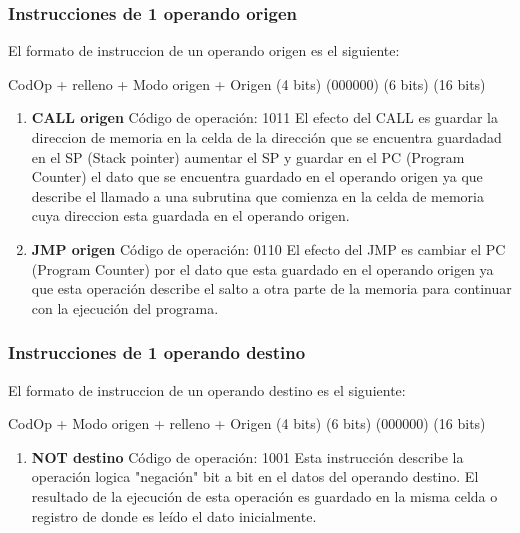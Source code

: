 \subsubsection{Instrucciones de 1 operando origen}

El formato de instruccion de un operando origen es el siguiente:

  CodOp   +   relleno   +  Modo origen +   Origen
(4 bits)      (000000)        (6 bits)    (16 bits)

\begin{enumerate}
\item \textbf{CALL origen}
Código de operación: 1011
El efecto del CALL es guardar la direccion de memoria en la celda de la dirección que se encuentra guardadad en el SP (Stack pointer) aumentar el SP y guardar en el PC (Program Counter) el dato que se encuentra guardado en el operando origen ya que describe el llamado a una subrutina que comienza en la celda de memoria cuya direccion esta guardada en el operando origen.

\item \textbf{JMP origen}
Código de operación: 0110
El efecto del JMP es cambiar el PC (Program Counter) por el dato que esta guardado en el operando origen ya que esta operación describe el salto a otra parte de la memoria para continuar con la ejecución del programa.
\end{enumerate}

\subsubsection{Instrucciones de 1 operando destino}

El formato de instruccion de un operando destino es el siguiente:

  CodOp   +  Modo origen  +  relleno  +  Origen
(4 bits)      (6 bits)      (000000)    (16 bits)

\begin{enumerate}
\item \textbf{NOT destino}
Código de operación: 1001
Esta instrucción describe la operación logica "negación" bit a bit en el datos del operando destino. El resultado de la ejecución de esta operación es guardado en la misma celda o registro de donde es leído el dato inicialmente.
\end{enumerate}


